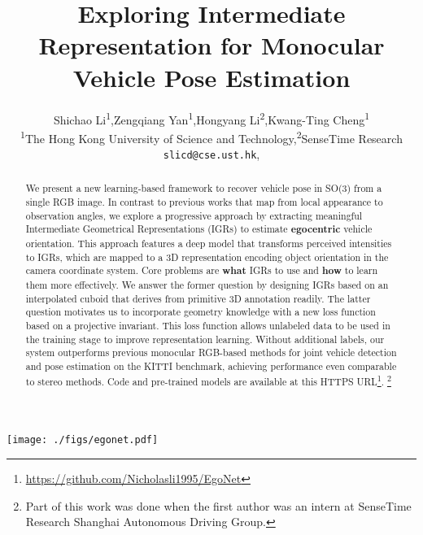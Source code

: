 \documentclass[final]{cvpr}
\title{Exploring Intermediate Representation for Monocular Vehicle Pose Estimation}
\author{Shichao Li\textsuperscript{1},\quad Zengqiang Yan\textsuperscript{1},\quad Hongyang Li\textsuperscript{2},\quad Kwang-Ting Cheng\textsuperscript{1}\\
	\textsuperscript{1}The Hong Kong University of Science and Technology,\quad  \textsuperscript{2}SenseTime Research \\ {\tt\small slicd@cse.ust.hk},
	\quad{\tt\small timcheng@ust.hk}
}
\begin{document}

\begin{abstract}  
We present a new learning-based framework to recover vehicle pose in SO(3) from a single RGB image. In contrast to previous works that map from local appearance to observation angles, we explore a progressive approach by extracting meaningful Intermediate Geometrical Representations (IGRs) to estimate \textbf{egocentric} vehicle orientation. This approach features a deep model that transforms perceived intensities to IGRs, which are mapped to a 3D representation encoding object orientation in the camera coordinate system. Core problems are \textbf{what} IGRs to use and \textbf{how} to learn them more effectively. We answer the former question by designing IGRs based on an interpolated cuboid that derives from primitive 3D annotation readily. The latter question motivates us to incorporate geometry knowledge with a new loss function based on a projective invariant. This loss function allows unlabeled data to be used in the training stage to improve representation learning. Without additional labels, our system outperforms previous monocular RGB-based methods for joint vehicle detection and pose estimation on the KITTI benchmark, achieving performance even comparable to stereo methods. Code and pre-trained models are available at this HTTPS URL\footnote{\url{https://github.com/Nicholasli1995/EgoNet}}. {\let\thefootnote\relax\footnote{{Part of this work was done when the first author was an intern at SenseTime Research Shanghai Autonomous Driving Group.}}}
\end{abstract}
\begin{figure*}[t]
	\begin{center}
		\texttt{[image: ./figs/egonet.pdf]}
	\end{center}
	\caption{Detailed architecture of Ego-Net. Feature maps are first computed with a fully convolution model  from a detected instance. Heatmaps representing the projection of a 3D cuboid are regressed and mapped to local coordinates with several strided convolution layers. The local coordinates are transformed to screen coordinates  and mapped to a 3D cuboid representation , whose orientation directly represent egocentric pose in the camera coordinate system. k=33 when q=2 as in Sec. \ref{MA}.}
	\label{fig:egonet}
\end{figure*}
\end{document}

